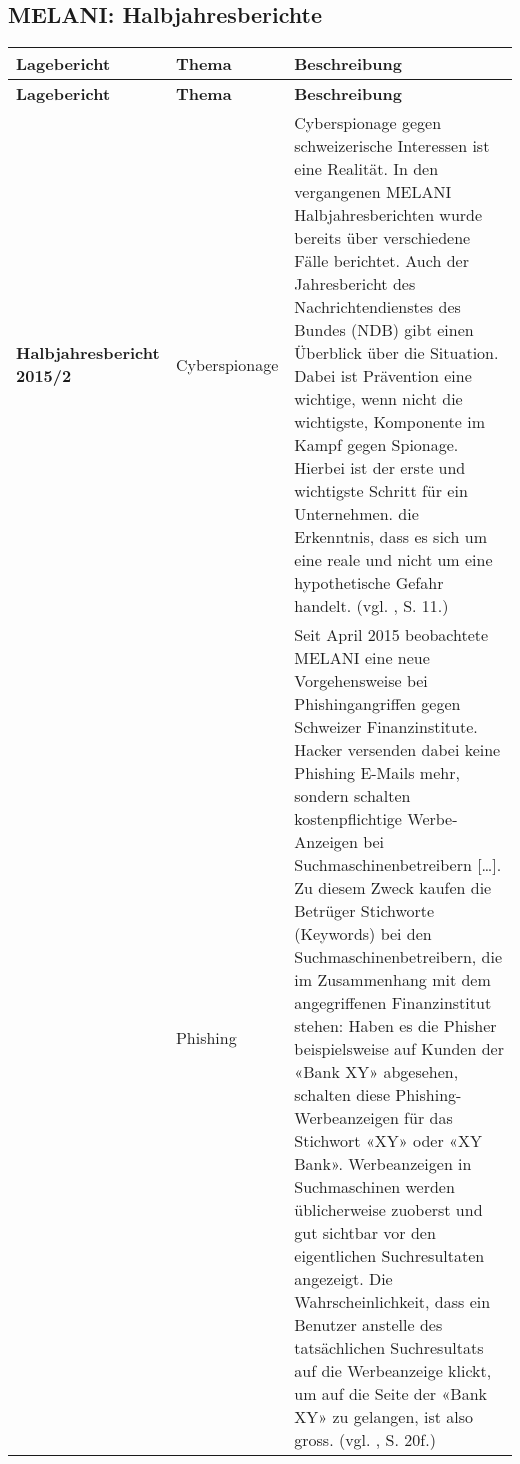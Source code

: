 \documentclass[../../main.tex]{subfiles}
\begin{document}
\newpage
\subsection*{MELANI: Halbjahresberichte}
\label{melani_halbjahresberichte}

\begin{sloppypar}


\sloppy 

\begin{longtable}[c]{ |p{4.0 cm}|p{4.5cm}|p{8.0cm}|}
 
\hline
\tableheaderbgcolor
\textbf{Lagebericht} & \textbf{Thema} & \textbf{Beschreibung} \\ 
\endfirsthead
 
\hline
\tableheaderbgcolor
\textbf{Lagebericht} & \textbf{Thema} & \textbf{Beschreibung} \\ 
\endhead

\endfoot
 
\endlastfoot

\textbf{Halbjahresbericht 2015/2} & Cyberspionage & Cyberspionage gegen schweizerische Interessen ist eine Realität. In den vergangenen MELANI Halbjahresberichten wurde bereits über verschiedene Fälle berichtet. Auch der Jahresbericht des Nachrichtendienstes des Bundes (NDB) gibt einen Überblick über die Situation. Dabei ist Prävention eine wichtige, wenn nicht die wichtigste, Komponente im Kampf gegen Spionage. Hierbei ist der erste und wichtigste Schritt für ein Unternehmen. die Erkenntnis, dass es sich um eine reale und nicht um eine hypothetische Gefahr handelt. 
\newline
(vgl. \cite{melani_halbjahresbericht_2015}, S. 11.)\\
\hline

& Phishing & Seit April 2015 beobachtete MELANI eine neue Vorgehensweise bei Phishingangriffen gegen Schweizer Finanzinstitute. Hacker versenden dabei keine Phishing E-Mails mehr, sondern schalten kostenpflichtige Werbe-Anzeigen bei Suchmaschinenbetreibern [\dots]. Zu diesem Zweck kaufen die Betrüger Stichworte (Keywords) bei den Suchmaschinenbetreibern, die im Zusammenhang mit dem angegriffenen Finanzinstitut stehen: Haben es die Phisher beispielsweise auf Kunden der «Bank XY» abgesehen, schalten diese Phishing-Werbeanzeigen für das Stichwort «XY» oder «XY Bank». Werbeanzeigen in Suchmaschinen werden üblicherweise zuoberst und gut sichtbar vor den eigentlichen Suchresultaten angezeigt. Die Wahrscheinlichkeit, dass ein Benutzer anstelle des tatsächlichen Suchresultats auf die Werbeanzeige klickt, um auf die Seite der «Bank XY» zu gelangen, ist also gross. 
\newline
(vgl. \cite{melani_halbjahresbericht_2015}, S. 20f.)\\
\hline


\end{longtable}
\end{sloppypar}
\end{document}

